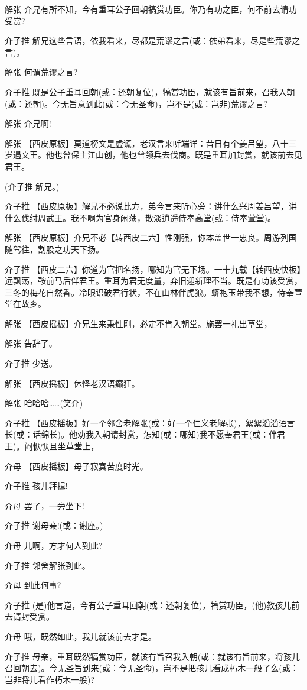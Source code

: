 解张
介兄有所不知，今有重耳公子回朝犒赏功臣。你乃有功之臣，何不前去请功受赏?

介子推
解兄这些言语，依我看来，尽都是荒谬之言(或：依弟看来，尽是些荒谬之言)。

解张 何谓荒谬之言?

介子推
既是公子重耳回朝(或：还朝复位)，犒赏功臣，就该有旨前来，召我入朝(或：还朝)。今无旨意到此(或：今无圣命)，岂不是(或：岂非)荒谬之言?

解张 介兄啊!

解张
【西皮原板】莫道榜文是虚谎，老汉言来听端详：昔日有个姜吕望，八十三岁遇文王。他也曾保主江山创，他也曾领兵去伐商。既是重耳加封赏，就该前去见君王。

(介子推 解兄。)

介子推
【西皮原板】解兄不必说比方，弟今言来听心旁：讲什么兴周姜吕望，讲什么伐纣周武王。我不啊为官身闲荡，散淡逍遥侍奉高堂(或：侍奉萱堂)。

解张
【西皮原板】介兄不必【转西皮二六】性刚强，你本盖世一忠良。周游列国随驾往，割股之功天下扬。

介子推
【西皮二六】你道为官把名扬，哪知为官无下场。一十九载【转西皮快板】远飘荡，鞍前马后伴君王。重耳为君无度量，弃旧迎新理不当。既是有功该受赏，三冬的梅花自然香。冷眼识破君行状，不在山林伴虎狼。蟒袍玉带我不想，侍奉萱堂在故乡。

解张 【西皮摇板】介兄生来秉性刚，必定不肯入朝堂。施罢一礼出草堂，

解张 告辞了。

介子推 少送。

解张 【西皮摇板】休怪老汉语癫狂。

解张 哈哈哈\ldots{}\ldots{}(笑介)

介子推
【西皮摇板】好一个邻舍老解张(或：好一个仁义老解张)，絮絮滔滔语言长(或：话绵长)。他劝我入朝请封赏，怎知(或：哪知)我不愿奉君王(或：伴君王)。闷恹恹且坐草堂上，

介母 【西皮摇板】母子寂寞苦度时光。

介子推 孩儿拜揖!

介母 罢了，一旁坐下!

介子推 谢母亲!(或：谢座。)

介母 儿啊，方才何人到此?

介子推 邻舍解张到此。

介母 到此何事?

介子推
(是)他言道，今有公子重耳回朝(或：还朝复位)，犒赏功臣，(他)教孩儿前去请封受赏。

介母 哦，既然如此，我儿就该前去才是。

介子推
母亲，重耳既然犒赏功臣，就该有旨召我入朝(或：就该有旨前来，将孩儿召回朝去)。今无圣旨到来(或：今无圣命)，岂不是把孩儿看成朽木一般了么(或：岂非将儿看作朽木一般)?

